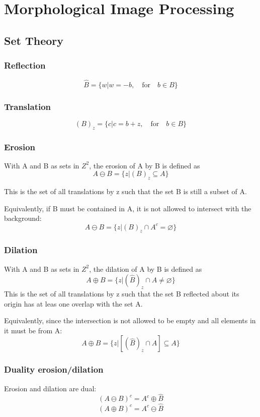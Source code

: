\section{Morphological Image Processing}
\subsection{Set Theory}
\subsubsection{Reflection}
\[
	\hat{B} = \{w | w = -b,\quad \text{for} \quad b \in B \}
\]


\subsubsection{Translation}
\[
	(B)_z = \{ c | c = b + z,\quad \text{for} \quad b \in B\}
\]


\subsubsection{Erosion}
With A and B as sets in $Z^2$, the erosion of A by B is defined as
\[
	A \ominus B = \{z|(B)_z \subseteq A  \}
\]

This is the set of all translations by z such that the set B is still a subset of A.

Equivalently, if B must be contained in A, it is not allowed to intersect with the background:
\[
	A \ominus B = \{z|(B)_z \cap A^c = \varnothing  \}
\]


\subsubsection{Dilation}
With A and B as sets in $Z^2$, the dilation of A by B is defined as
\[
	A \oplus B = \{z |(\hat{B})_z \cap A \neq \varnothing \}
\]
This is the set of all translations by z such that the set B reflected about its origin has at leas one overlap with the set A.

Equivalently, since the intersection is not allowed to be empty and all elements in it must be from A:
\[
	A \oplus B = \{z | [(\hat{B})_z \cap A] \subseteq A \}
\]


\subsubsection{Duality erosion/dilation}
Erosion and dilation are dual:
\[
	(A  \ominus B)^c = A^c \oplus \hat{B}
\]
\[
	(A \oplus B)^c = A^c \ominus \hat{B}
\]


